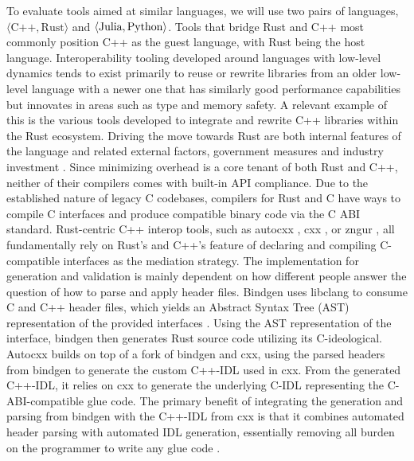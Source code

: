 To evaluate tools aimed at similar languages, we will use two pairs of languages, $\langle \text{C++}, \text{Rust}\rangle $ and $\langle \text{Julia}, \\ \text{Python} \rangle$. Tools that bridge Rust and C++ most commonly position C++ as the guest language, with Rust being the host language. Interoperability tooling developed around languages with low-level dynamics tends to exist primarily to reuse or rewrite libraries from an older low-level language with a newer one that has similarly good performance capabilities but innovates in areas such as type and memory safety. A relevant example of this is the various tools developed to integrate and rewrite C++ libraries within the Rust ecosystem. Driving the move towards Rust are both internal features of the language and related external factors, government measures \cite{ONCD2024} and industry investment \cite{RustFoundation2024}. Since minimizing overhead is a core tenant of both Rust and C++, neither of their compilers comes with built-in API compliance. Due to the established nature of legacy C codebases, compilers for Rust and C have ways to compile C interfaces and produce compatible binary code via the C ABI standard. Rust-centric C++ interop tools, such as autocxx \cite{Taylor2025google}, cxx \cite{cxx2025}, or zngur \cite{zngur2025}, all fundamentally rely on Rust's and C++'s feature of declaring and compiling C-compatible interfaces as the mediation strategy. The implementation for generation and validation is mainly dependent on how different people answer the question of how to parse and apply header files. Bindgen \cite{rust-bindgen} uses libclang to consume C and C++ header files, which yields an Abstract Syntax Tree (AST) representation of the provided interfaces \cite{libclang}. Using the AST representation of the interface, bindgen then generates Rust source code utilizing its C-ideological. Autocxx builds on top of a fork of bindgen and cxx, using the parsed headers from bindgen to generate the custom C++-IDL used in cxx. From the generated C++-IDL, it relies on cxx to generate the underlying C-IDL representing the C-ABI-compatible glue code. The primary benefit of integrating the generation and parsing from bindgen with the C++-IDL from cxx is that it combines automated header parsing with automated IDL generation, essentially removing all burden on the programmer to write any glue code \cite{crubit-cxx-design}.

